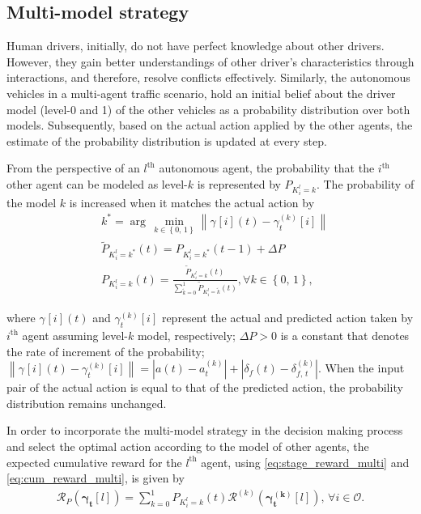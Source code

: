 \documentclass[10pt,journal]{IEEEtran}
\newcommand{\nth}[1]{$#1^{\textrm{th}}$}
\newcommand{\actk}[3]{\gamma^{\left(#2\right)}_{#3}[#1]}
\newcommand{\actt}[3]{\gamma^{}[#1](#3)}
\begin{document}
	\subsection{Multi-model strategy}

	Human drivers, initially, do not have perfect knowledge about other drivers. However, they gain better understandings of other driver's characteristics through interactions, and therefore, resolve conflicts effectively. Similarly, the autonomous vehicles in a multi-agent traffic scenario, hold an initial belief about the driver model (level-0 and 1) of the other vehicles as a probability distribution over both models. Subsequently, based on the actual action applied by the other agents, the estimate of the probability distribution is updated at every step.
	
	From the perspective of an \nth{l} autonomous agent, the probability that the \nth{i} other agent can be modeled as level-$k$ is represented by $P_{K_{i}^l = k}$. The probability of the model $k$ is increased when it matches the actual action by 
	\begin{subequations} \label{lv_est}
		\begin{align}
			&k^* = \arg \, \underset{k \in \left\{0,\,1 \right\}} {\min} \left\| \actt{i}{k}{t} - \actk{i}{k}{t}  \right\|  \\ 
			& \tilde{P}_{K_{i}^l = k^*} \left(t\right) = {P}_{K_{i}^l = k^*} \left(t-1\right) + \Delta P  \\ 
			& {P}_{K_{i}^l = k}\left(t\right) = \frac{\tilde{P}_{K_{i}^l = k}\left(t\right) }{\sum_{\tilde{k} = 0}^{1} \tilde{P}_{K_{i}^l = \tilde{k}}\left(t\right) },  \forall k \in \left\{0,\,1 \right\},
		\end{align}
		\label{eq:model_update}
	\end{subequations}
	
	\noindent where $\actt{i}{k}{t}$ and $\actk{i}{k}{t}$ represent the actual and predicted action taken by \nth{i} agent assuming level-$k$ model, respectively; $\Delta P >0 $ is a constant that denotes the rate of increment of the probability;  $\left\|\actt{i}{k}{t} - \actk{i}{k}{t}\right\| = \left| a\left(t\right) - a_t^{(k)} \right| + \left|  \delta_f\left(t\right) - \delta_{f,\,t}^{(k)} \right|$. When the input pair of the actual action is equal to that of the predicted action, the probability distribution remains unchanged.

	
	In order to incorporate the multi-model strategy in the decision making process and select the optimal action according to the model of other agents, the expected cumulative reward for the \nth{l} agent, using \eqref{eq:stage_reward_multi} and \eqref{eq:cum_reward_multi}, is given by
	\begin{align}
		\mathcal{R}_P\left(\boldsymbol{\gamma_{t}}[l]\right)  = \sum_{k=0}^{1} {P}_{K_{i}^l = k}\left(t\right)  \mathcal{R}^{(k)}\left(\boldsymbol{\gamma_{t}^{(k)}}[l]\right),\, \forall i \in \mathcal{O}.
		\label{eq:cum_reward_prob}
	\end{align}
	 
\end{document}
